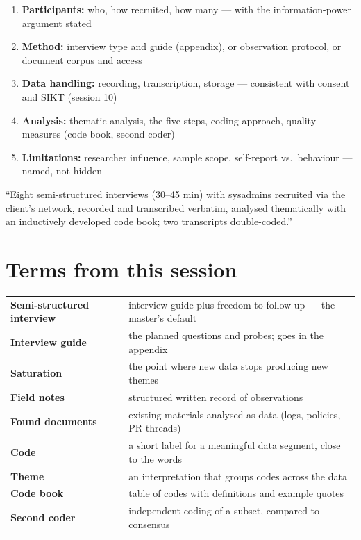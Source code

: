 \documentclass[11pt,a4paper,british,twoside=false,headings=small,chapterprefix=false,numbers=noenddot]{scrbook}
\newenvironment{block}[1]{\begin{tcolorbox}[scriptbox, title={#1}]}{\end{tcolorbox}}
\begin{document}
\begin{center}\small
\small
  \begin{enumerate}\setlength{\itemsep}{0.3em}
    \item \textbf{Participants:} who, how recruited, how many --- with the
          information-power argument stated
    \item \textbf{Method:} interview type and guide (appendix), or
          observation protocol, or document corpus and access
    \item \textbf{Data handling:} recording, transcription, storage ---
          consistent with consent and SIKT (session 10)
    \item \textbf{Analysis:} thematic analysis, the five steps, coding
          approach, quality measures (code book, second coder)
    \item \textbf{Limitations:} researcher influence, sample scope,
          self-report vs.\ behaviour --- named, not hidden
  \end{enumerate}
  \begin{block}{Example line}
    \small ``Eight semi-structured interviews (30--45 min) with sysadmins
    recruited via the client's network, recorded and transcribed verbatim,
    analysed thematically with an inductively developed code book; two
    transcripts double-coded.''
  \end{block}
\end{center}


\section*{Terms from this session}
\begin{center}\small
\footnotesize
  \renewcommand{\arraystretch}{1.18}
  \begin{tabular}{@{}p{3.8cm}p{9.7cm}@{}}
    \toprule
    \textbf{Semi-structured interview} & interview guide plus freedom to follow up --- the master's default\\
    \textbf{Interview guide} & the planned questions and probes; goes in the appendix\\
    \textbf{Saturation} & the point where new data stops producing new themes\\
    \textbf{Field notes} & structured written record of observations\\
    \textbf{Found documents} & existing materials analysed as data (logs, policies, PR threads)\\
    \textbf{Code} & a short label for a meaningful data segment, close to the words\\
    \textbf{Theme} & an interpretation that groups codes across the data\\
    \textbf{Code book} & table of codes with definitions and example quotes\\
    \textbf{Second coder} & independent coding of a subset, compared to consensus\\
    \bottomrule
  \end{tabular}
\end{center}
\end{document}
